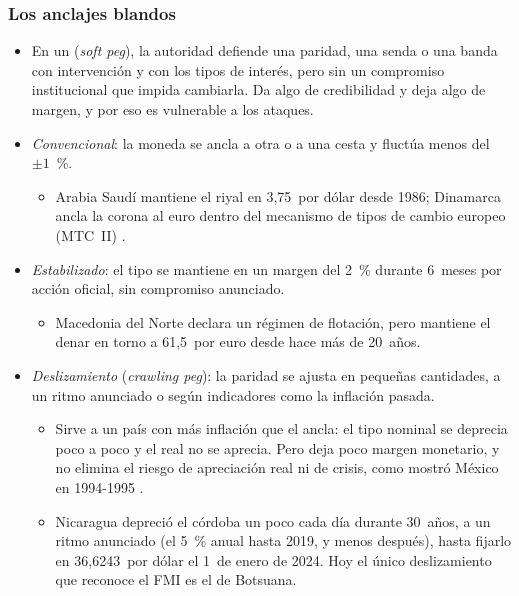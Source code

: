 \documentclass[11pt]{article}
\begin{document}
\subsubsection{Los anclajes blandos}\label{sec:anclajes-blandos}

\begin{itemize}
\item En un  (\emph{soft peg}), la autoridad defiende una paridad, una senda o una banda con intervención y con los tipos de interés, pero sin un compromiso institucional que impida cambiarla. Da algo de credibilidad y deja algo de margen, y por eso es vulnerable a los ataques.
\item \emph{Convencional}: la moneda se ancla a otra o a una cesta y fluctúa menos del $\pm1$~\%.
  \begin{itemize}
  \item Arabia Saudí mantiene el riyal en 3,75~por dólar desde 1986\nocite{SAMA2016TipoCambio,BIS2026TiposBilaterales}; Dinamarca ancla la corona al euro dentro del mecanismo de tipos de cambio europeo (MTC~II) .
  \end{itemize}
\item \emph{Estabilizado}: el tipo se mantiene en un margen del 2~\% durante 6~meses por acción oficial, sin compromiso anunciado.
  \begin{itemize}
  \item Macedonia del Norte declara un régimen de flotación, pero mantiene el denar en torno a 61,5~por euro desde hace más de 20~años\nocite{FMI2026InformeAnual,BIS2026TiposBilaterales}.
  \end{itemize}
\item \emph{Deslizamiento} (\emph{crawling peg}): la paridad se ajusta en pequeñas cantidades, a un ritmo anunciado o según indicadores como la inflación pasada.
  \begin{itemize}
  \item Sirve a un país con más inflación que el ancla: el tipo nominal se deprecia poco a poco y el real no se aprecia. Pero deja poco margen monetario, y no elimina el riesgo de apreciación real ni de crisis, como mostró México en 1994-1995 .
  \item Nicaragua depreció el córdoba un poco cada día durante 30~años, a un ritmo anunciado (el 5~\% anual hasta 2019, y menos después), hasta fijarlo en 36,6243~por dólar el 1~de enero de 2024\nocite{BCN2023Deslizamiento,BIS2026TiposBilaterales}. Hoy el único deslizamiento que reconoce el FMI es el de Botsuana\nocite{FMI2026InformeAnual}.

\end{itemize}
\end{itemize}
\end{document}
